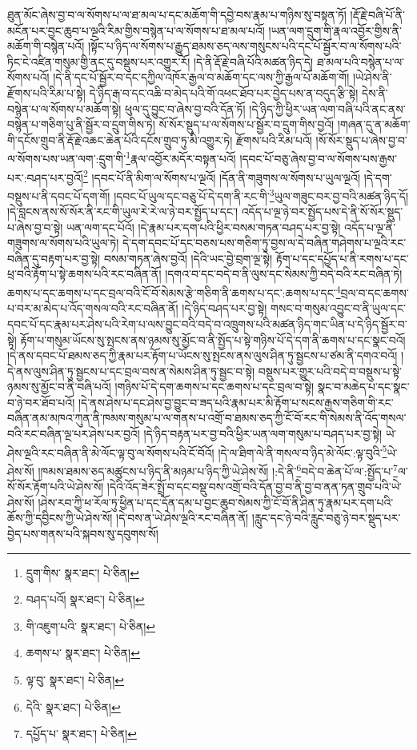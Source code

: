 ཐུན་མོང་ཞེས་བྱ་བ་ལ་སོགས་པ་ལ་ཐ་མལ་པ་དང་མཆོག་གི་དབྱེ་བས་རྣམ་པ་གཉིས་སུ་བསྟན་ཏོ། །རྡོ་རྗེ་བཞི་པོ་ནི་མངོན་པར་བྱང་ཆུབ་པ་ལྔའི་རིམ་གྱིས་བསྙེན་པ་ལ་སོགས་པ་ཐ་མལ་པའོ། །ཡན་ལག་དྲུག་གི་རྣལ་འབྱོར་གྱིས་ནི་མཆོག་གི་བསྙེན་པའོ། །སྟོང་པ་ཉིད་ལ་སོགས་པ་རྒྱུད་ཐམས་ཅད་ལས་གསུངས་པའི་དང་པོ་སྦྱོར་བ་ལ་སོགས་པའི་ཏིང་ངེ་འཛིན་གསུམ་གྱི་ནང་དུ་བསྡུས་པར་འགྱུར་རོ། །དེ་ནི་རྡོ་རྗེ་བཞི་པོའི་མཚན་ཉིད་དེ། ཐ་མལ་པའི་བསྙེན་པ་ལ་སོགས་པའོ། །དེ་ནི་དང་པོ་སྦྱོར་བ་དང་དཀྱིལ་འཁོར་རྒྱལ་བ་མཆོག་དང་ལས་ཀྱི་རྒྱལ་པོ་མཆོག་གོ། །ཡེ་ཤེས་ནི་རྫོགས་པའི་རིམ་པ་སྟེ། དེ་ཉིད་རྒ་བ་དང་འཆི་བ་མེད་པའི་གོ་འཕང་ཐོབ་པར་བྱེད་པས་ན་བདུད་རྩི་སྟེ། དེས་ནི་བསྙེན་པ་ལ་སོགས་པ་མཆོག་སྟེ། ཕུལ་དུ་བྱུང་བ་ཞེས་བྱ་བའི་དོན་ཏོ། །དེ་ཉིད་ཀྱི་ཕྱིར་ཡན་ལག་བཞི་པའི་ནང་ནས་བསྙེན་པ་གཅིག་པུ་ནི་སྦྱོར་བ་དྲུག་གིས་ཏེ། སོ་སོར་སྡུད་པ་ལ་སོགས་པ་སྦྱོར་བ་དྲུག་གིས་བྱའོ། །གཞན་དུ་ན་མཆོག་གི་དངོས་གྲུབ་ནི་རྡོ་རྗེ་འཆང་ཆེན་པོའི་དངོས་གྲུབ་ཏུ་མི་འགྱུར་ཏེ། རྫོགས་པའི་རིམ་པའོ། །སོ་སོར་སྡུད་པ་ཞེས་བྱ་བ་ལ་སོགས་པས་ཡན་ལག་:དྲུག་གི་\footnote{དྲུག་གིས་  སྣར་ཐང་།  པེ་ཅིན། }རྣལ་འབྱོར་མདོར་བསྟན་པའོ། །དབང་པོ་བཅུ་ཞེས་བྱ་བ་ལ་སོགས་པས་རྒྱས་པར་:བཤད་པར་བྱའོ།\footnote{བཤད་པའོ།  སྣར་ཐང་།  པེ་ཅིན། } །དབང་པོ་ནི་མིག་ལ་སོགས་པ་ལྔའོ། །དོན་ནི་གཟུགས་ལ་སོགས་པ་ཡུལ་ལྔའོ། །དེ་དག་བསྡུས་པ་ནི་དབང་པོ་དག་གོ། །དབང་པོ་ཡུལ་དང་བཅུ་པོ་དེ་དག་ནི་རང་གི་\footnote{གི་འཇུག་པའི་  སྣར་ཐང་།  པེ་ཅིན། }ཡུལ་གཟུང་བར་བྱ་བའི་མཚན་ཉིད་དོ། །དེ་བླངས་ནས་སོ་སོར་ནི་རང་གི་ཡུལ་རེ་རེ་ལ་ཉེ་བར་སྤྱོད་པ་དང་། འདོད་པ་ལྔ་ཉེ་བར་སྤྱོད་པས་དེ་ནི་སོ་སོར་སྡུད་པ་ཞེས་བྱ་བ་སྟེ། ཡན་ལག་དང་པོའོ། །དེ་རྣམ་པར་དག་པའི་ཕྱིར་བསམ་གཏན་བཤད་པར་བྱ་སྟེ། འདོད་པ་ལྔ་ནི་གཟུགས་ལ་སོགས་པའི་ཡུལ་ཏེ། དེ་དག་དབང་པོ་དང་བཅས་པས་གཅིག་ཏུ་བྱས་ལ་དེ་བཞིན་གཤེགས་པ་ལྔའི་རང་བཞིན་དུ་བརྟག་པར་བྱ་སྟེ། བསམ་གཏན་ཞེས་བྱའོ། །དེའི་ཡང་བྱེ་བྲག་ལྔ་སྟེ། རྟོག་པ་དང་དཔྱོད་པ་ནི་རགས་པ་དང་ཕྲ་བའི་རྟོག་པ་སྟེ་ཆགས་པའི་རང་བཞིན་ནོ། །དགའ་བ་དང་བདེ་བ་ནི་ལུས་དང་སེམས་ཀྱི་བདེ་བའི་རང་བཞིན་ཏེ། ཆགས་པ་དང་ཆགས་པ་དང་བྲལ་བའི་ངོ་བོ་སེམས་རྩེ་གཅིག་ནི་ཆགས་པ་དང་:ཆགས་པ་དང་\footnote{ཆགས་པ་  སྣར་ཐང་།  པེ་ཅིན། }བྲལ་བ་དང་ཆགས་པ་བར་མ་མེད་པ་འོད་གསལ་བའི་རང་བཞིན་ནོ། །དེ་ཉིད་བཤད་པར་བྱ་སྟེ། གསང་བ་གསུམ་འབྱུང་བ་ནི་ཡུལ་དང་དབང་པོ་དང་རྣམ་པར་ཤེས་པའི་རེག་པ་ལས་བྱུང་བའི་བདེ་བ་འཁྲུགས་པའི་མཚན་ཉིད་གང་ཡིན་པ་དེ་ཉིད་སྦྱོར་བ་སྟེ། རྟོག་པ་གསུམ་ཡོངས་སུ་སྤངས་ནས་ཉམས་སུ་མྱོང་བ་ནི་སྤྱོད་པ་སྟེ་གཉིས་པོ་དེ་དག་ནི་ཆགས་པ་དང་སྣང་བའོ། །དེ་ནས་དབང་པོ་ཐམས་ཅད་ཀྱི་རྣམ་པར་རྟོག་པ་ཡོངས་སུ་སྤངས་ནས་ལུས་ཤིན་ཏུ་སྦྱངས་པ་ཙམ་ནི་དགའ་བའོ། །དེ་ནས་ལུས་ཤིན་ཏུ་སྦྱངས་པ་དང་བྲལ་བས་ན་སེམས་ཤིན་ཏུ་སྦྱང་བ་སྟེ། བསྡུས་པར་གྱུར་པའི་བདེ་བ་བསྡུས་པ་སྟེ་ཉམས་སུ་མྱོང་བ་ནི་བཞི་པའོ། །གཉིས་པོ་དེ་དག་ཆགས་པ་དང་ཆགས་པ་དང་བྲལ་བ་སྟེ། སྣང་བ་མཆེད་པ་དང་སྣང་བ་ཉེ་བར་ཐོབ་པའོ། །དེ་ནས་ཤེས་པ་དང་ཤེས་བྱ་བྱུང་བ་ཟད་པའི་རྣམ་པར་མི་རྟོག་པ་སངས་རྒྱས་གཅིག་གི་རང་བཞིན་ནམ་མཁའ་ཀུན་ནི་ཁམས་གསུམ་པ་ལ་གནས་པ་འགྲོ་བ་ཐམས་ཅད་ཀྱི་ངོ་བོ་རང་གི་སེམས་ནི་འོད་གསལ་བའི་རང་བཞིན་ལྔ་པར་ཤེས་པར་བྱའོ། །དེ་ཉིད་བརྟན་པར་བྱ་བའི་ཕྱིར་ཡན་ལག་གསུམ་པ་བཤད་པར་བྱ་སྟེ། ཡེ་ཤེས་ལྔའི་རང་བཞིན་ནི་མེ་ལོང་ལྟ་བུ་ལ་སོགས་པའི་ངོ་བོའོ། །དེ་ལ་ཐིག་ལེ་ནི་གསལ་བ་ཉིད་མེ་ལོང་:ལྟ་བུའི་\footnote{ལྟ་བུ་  སྣར་ཐང་།  པེ་ཅིན། }ཡེ་ཤེས་སོ། །ཁམས་ཐམས་ཅད་མཚུངས་པ་ཉིད་ནི་མཉམ་པ་ཉིད་ཀྱི་ཡེ་ཤེས་སོ། །:དེ་ནི་\footnote{དེའི་  སྣར་ཐང་།  པེ་ཅིན། }བདེ་བ་ཆེན་པོ་ལ་:སྤྱོད་པ་\footnote{དཔྱོད་པ་  སྣར་ཐང་།  པེ་ཅིན། }ལ་སོ་སོར་རྟོག་པའི་ཡེ་ཤེས་སོ། །དེའི་འོད་ཟེར་སྤྲོ་བ་དང་བསྡུ་བས་འགྲོ་བའི་དོན་བྱ་བ་ནི་བྱ་བ་ནན་ཏན་གྲུབ་པའི་ཡེ་ཤེས་སོ། །ཤེས་རབ་ཀྱི་ཕ་རོལ་ཏུ་ཕྱིན་པ་དང་དོན་དམ་པ་བྱང་ཆུབ་སེམས་ཀྱི་ངོ་བོ་ནི་ཤིན་ཏུ་རྣམ་པར་དག་པའི་ཆོས་ཀྱི་དབྱིངས་ཀྱི་ཡེ་ཤེས་སོ། །དེ་བས་ན་ཡེ་ཤེས་ལྔའི་རང་བཞིན་ནོ། །རླུང་དང་ཉེ་བའི་རླུང་བཅུ་ཉེ་བར་སྡུད་པར་བྱེད་པས་གནས་པའི་སྐབས་སུ་དབུགས་སོ། 